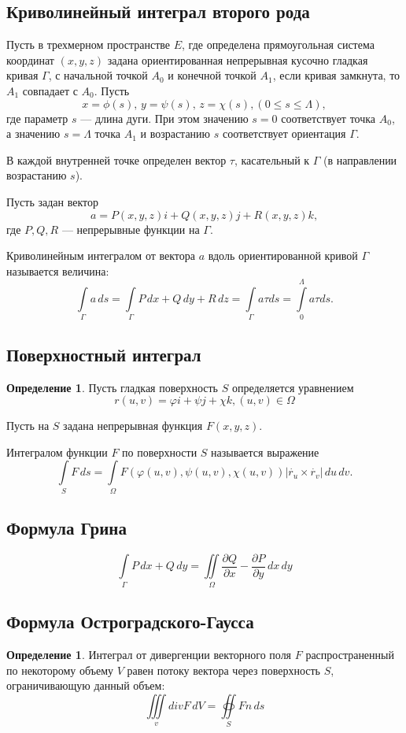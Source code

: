 \documentclass[12pt]{report}
\theoremstyle{definition}
\newtheorem{definition}[theorem]{Определение}
\begin{document}
\subsection{Криволинейный интеграл второго рода}
Пусть в трехмерном пространстве $E$, где определена
прямоугольная система координат $(x, y, z)$ задана ориентированная непрерывная
кусочно гладкая кривая $\Gamma$, с начальной точкой $A_0$ и конечной точкой $A_1$,
если кривая замкнута, то $A_1$ совпадает с $A_0$. Пусть 
$$
x = \phi(s), \,y = \psi(s), \, z = \chi(s), (0 \le s \le \Lambda),
$$
где параметр $s$  --- длина дуги.
При этом значению $s=0$ соответствует точка $A_0$, а значению $s = \Lambda$ точка
$A_1$ и возрастанию $s$ соответствует ориентация $\Gamma$.

В каждой внутренней точке определен вектор $\tau$, касательный к $\Gamma$
(в направлении возрастанию $s$).

Пусть задан вектор
$$
a = P(x, y, z) i + Q(x, y, z) j + R(x, y, z) k,
$$
где $P, Q, R$ --- непрерывные функции на $\Gamma$.

Криволинейным интегралом от вектора $a$ вдоль ориентированной кривой $\Gamma$
называется величина:
$$
\int\limits_{\Gamma} a \, ds =
\int\limits_{\Gamma} P\, dx + Q\, dy + R\, dz =
\int\limits_{\Gamma} a \tau ds = 
\int\limits_{0}^{\Lambda} a \tau ds.
$$

\subsection{Поверхностный интеграл}
\begin{definition}
Пусть гладкая поверхность $S$ определяется уравнением
$$
r(u, v) = \varphi i + \psi j + \chi k, (u, v) \in \Omega
$$

Пусть на $S$ задана непрерывная функция $F(x, y, z)$.

Интегралом функции $F$ по поверхности $S$
называется выражение
$$
\int\limits_{S} F\, ds = 
\int\limits_{\Omega} F(\varphi(u, v), \psi(u, v), \chi(u, v))
|\dot{r_u} \times \dot{r_v}|\, du \, dv.
$$
\end{definition}

\subsection{Формула Грина}
$$
\int\limits_{\Gamma} P\, dx + Q\, dy = 
\iint\limits_{\Omega} \dfrac{\partial Q}{\partial x} - \dfrac{\partial P}{\partial y} \, dx\, dy
$$

\subsection{Формула Остроградского-Гаусса}
\begin{definition}
Интеграл от дивергенции векторного поля $F$ распространенный по некоторому
объему $V$ равен потоку вектора через поверхность $S$, ограничивающую данный
объем:
$$
\iiint\limits_{v} div F\, dV = 
\oiint\limits_{S} F n \, ds
$$
\end{definition}
\end{document}
